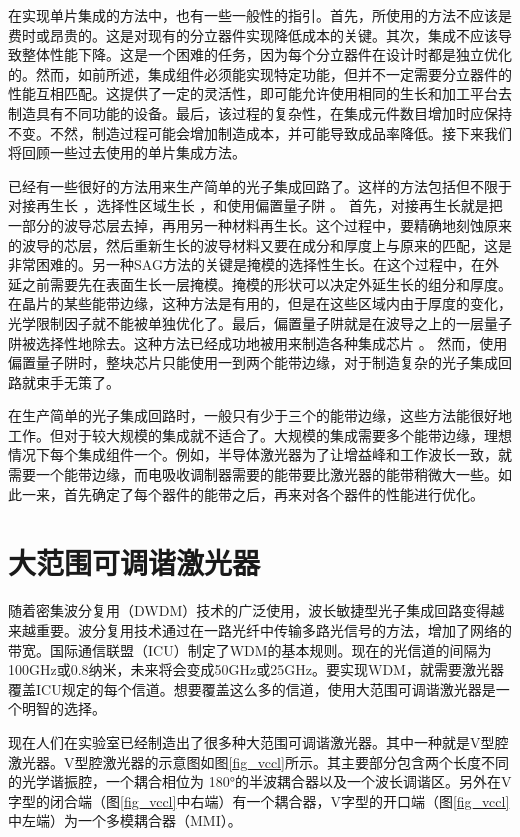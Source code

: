 \documentclass{ZJUthesis}
\begin{document}
在实现单片集成的方法中，也有一些一般性的指引。首先，所使用的方法不应该是费时或昂贵的。这是对现有的分立器件实现降低成本的关键。其次，集成不应该导致整体性能下降。这是一个困难的任务，因为每个分立器件在设计时都是独立优化的。然而，如前所述，集成组件必须能实现特定功能，但并不一定需要分立器件的性能互相匹配。这提供了一定的灵活性，即可能允许使用相同的生长和加工平台去制造具有不同功能的设备。最后，该过程的复杂性，在集成元件数目增加时应保持不变。不然，制造过程可能会增加制造成本，并可能导致成品率降低。接下来我们将回顾一些过去使用的单片集成方法。

已经有一些很好的方法用来生产简单的光子集成回路了。这样的方法包括但不限于对接再生长 \cite{binsma1997characterization-BJR}，选择性区域生长 \cite{aoki1993ingaas-SAG}，和使用偏置量子阱 \cite{mason1999widely-offset}。 首先，对接再生长就是把一部分的波导芯层去掉，再用另一种材料再生长。这个过程中，要精确地刻蚀原来的波导的芯层，然后重新生长的波导材料又要在成分和厚度上与原来的匹配，这是非常困难的。另一种SAG方法的关键是掩模的选择性生长。在这个过程中，在外延之前需要先在表面生长一层掩模。掩模的形状可以决定外延生长的组分和厚度。在晶片的某些能带边缘，这种方法是有用的，但是在这些区域内由于厚度的变化，光学限制因子就不能被单独优化了。最后，偏置量子阱就是在波导之上的一层量子阱被选择性地除去。这种方法已经成功地被用来制造各种集成芯片 \cite{mason1999widely-offset} \cite{mason2000design-offset} \cite{mason1998tunable-offset} \cite{fish1998compact-offset}。 然而，使用偏置量子阱时，整块芯片只能使用一到两个能带边缘，对于制造复杂的光子集成回路就束手无策了。

在生产简单的光子集成回路时，一般只有少于三个的能带边缘，这些方法能很好地工作。但对于较大规模的集成就不适合了。大规模的集成需要多个能带边缘，理想情况下每个集成组件一个。例如，半导体激光器为了让增益峰和工作波长一致，就需要一个能带边缘，而电吸收调制器需要的能带要比激光器的能带稍微大一些。如此一来，首先确定了每个器件的能带之后，再来对各个器件的性能进行优化。

\section{大范围可调谐激光器}

随着密集波分复用（DWDM）技术的广泛使用，波长敏捷型光子集成回路变得越来越重要。波分复用技术通过在一路光纤中传输多路光信号的方法，增加了网络的带宽。国际通信联盟（ICU）制定了WDM的基本规则。现在的光信道的间隔为100GHz或0.8纳米，未来将会变成50GHz或25GHz。要实现WDM，就需要激光器覆盖ICU规定的每个信道。想要覆盖这么多的信道，使用大范围可调谐激光器是一个明智的选择。

现在人们在实验室已经制造出了很多种大范围可调谐激光器。其中一种就是V型腔激光器。V型腔激光器的示意图如图\ref{fig_vccl}所示。其主要部分包含两个长度不同的光学谐振腔，一个耦合相位为 180°的半波耦合器以及一个波长调谐区。另外在V字型的闭合端（图\ref{fig_vccl}中右端）有一个耦合器，V字型的开口端（图\ref{fig_vccl} 中左端）为一个多模耦合器（MMI）。
\end{document}
